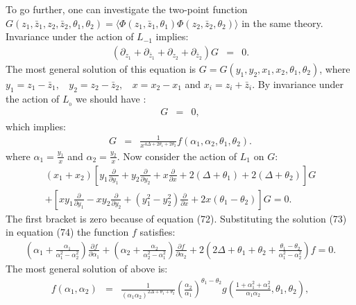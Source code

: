 \documentclass[a4paper,11pt]{article}
\begin{document}
To go further, one can investigate the two-point function
$G(z_{1},\bar{z}_{1},z_{2},\bar{z}_{2},\theta_{1},\theta_{2})=
\langle\Phi(z_{1},\bar{z}_{1},\theta_{1})\Phi(z_{2},
\bar{z}_{2},\theta_{2})\rangle$ in the same theory. Invariance
under the action of $L_{-1}$ implies:
\begin{eqnarray}
(\partial_{z_{1}}+\partial_{\bar{z}_{1}}+\partial_{z_{2}}+\partial_{\bar{z}_{2}})G&=&0
.
\end{eqnarray}
The most general solution of this equation is
$G=G(y_{1},y_{2},x_{1},x_{2},\theta_{1},\theta_{2})$, where
$y_{1}=z_{1}-\bar{z}_{1},\:\:\:\:y_{2}=z_{2}-\bar{z}_{2},
\:\:\:\:x=x_{2}-x_{1}$ and $x_{i}=z_{i}+\bar{z}_{i}$. By
invariance under the action of $L_{_{0}}$ we should have :
\begin{eqnarray}
[y_{1}\frac{\partial}{\partial
y_{1}}+y_{2}\frac{\partial}{\partial
y_{2}}+x\frac{\partial}{\partial
x}+2(\Delta+\theta_{1})+2(\Delta+\theta_{2})]G&=&0 ,
\end{eqnarray}
which implies:
\begin{eqnarray}
G&=&\frac{1}{x^{4\Delta+2\theta_{1}+2\theta_{2}}}
f(\alpha_{1},\alpha_{2},\theta_{1},\theta_{2}) .
\end{eqnarray}
where $\alpha_{1}=\frac{y_{1}}{x}$ and
$\alpha_{2}=\frac{y_{2}}{x}$. Now consider the action of $L_{1}$
on $G$:
\begin{eqnarray}
(x_{1}+x_{2})[y_{1}\frac{\partial}{\partial
y_{1}}+y_{2}\frac{\partial}{\partial
y_{2}}+x\frac{\partial}{\partial
x}+2(\Delta+\theta_{1})+2(\Delta+\theta_{2})]G\nonumber\\
+[xy_{1}\frac{\partial}{\partial
y_{1}}-xy_{2}\frac{\partial}{\partial
y_{2}}+(y_{1}^{2}-y_{2}^{2})\frac{\partial}{\partial x}
+2x(\theta_{1}-\theta_{2})]G=0 .
\end{eqnarray}
The first bracket is zero because of equation (72). Substituting
the solution (73) in equation (74) the function $f$ satisfies:
\begin{eqnarray}
\left(\alpha_{1}+\frac{\alpha_{1}}{\alpha_{1}^{2}-
\alpha_{2}^{2}}\right)\frac{\partial f }{\partial
\alpha_{1}}+\left(\alpha_{2}+\frac{\alpha_{2}}{\alpha_{2}^{2}
-\alpha_{1}^{2}}\right)\frac{\partial f }{\partial
\alpha_{2}}+2\left(2\Delta+\theta_{1}+\theta_{2}+\frac{\theta_{1}
-\theta_{2}}{\alpha_{1}^{2}-\alpha_{2}^{2}}\right)f=0.
\end{eqnarray}
The most general solution of above is:
\begin{eqnarray}
f(\alpha_{1},\alpha_{2})&=&\frac{1}{(\alpha_{1}\alpha_{2})^
{2\Delta+\theta_{1}+\theta_{2}}}
\left(\frac{\alpha_{2}}{\alpha_{1}}\right)^{\theta_{1}-\theta_{2}}
g\left(\frac{1+\alpha_{1}^{2}+\alpha_{2}^{2}}{\alpha_{1}
\alpha_{2}},\theta_{1},\theta_{2}\right),
\end{eqnarray}
\end{document}
